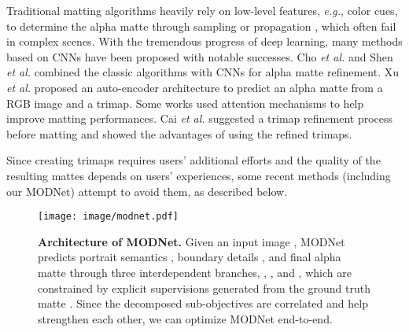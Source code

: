 \documentclass[letterpaper]{article} \usepackage{aaai22}  \usepackage{times}  \usepackage{helvet}  \usepackage{courier}  \usepackage[hyphens]{url}  \usepackage{graphicx} \urlstyle{rm} \def\UrlFont{\rm}  \usepackage{natbib}  \usepackage{caption} \usepackage{booktabs}
\begin{document}
Traditional matting algorithms heavily rely on low-level features, {\it e.g.}, color cues, to determine the alpha matte through sampling \cite{sampling_chuang, sampling_feng, sampling_gastal, sampling_he, sampling_johnson, sampling_karacan, sampling_ruzon,yang2018active} or propagation \cite{prop_aksoy2, prop_aksoy, prop_bai, prop_chen, prop_grady, prop_levin, prop_levin2, prop_sun}, which often fail in complex scenes. With the tremendous progress of deep learning, many methods based on CNNs have been proposed with notable successes. Cho {\it et al.} \cite{NIMUDCNN} and Shen {\it et al.} \cite{DAPM} combined the classic algorithms with CNNs for alpha matte refinement. Xu {\it et al.} \cite{DIM} proposed an auto-encoder architecture to predict an alpha matte from a RGB image and a trimap. Some works \cite{GCA, IndexMatter} used attention mechanisms to help improve matting performances. 
Cai {\it et al.} \cite{AdaMatting} suggested a trimap refinement process before matting and showed the advantages of using the refined trimaps. 

Since creating trimaps requires users' additional efforts and the quality of the resulting mattes depends on users' experiences, some recent methods (including our MODNet) attempt to avoid them, as described below.




\begin{figure*}[t]
\begin{center}
   \texttt{[image: image/modnet.pdf]}
\end{center}
   \caption{\textbf{Architecture of MODNet.}  
    Given an input image , MODNet predicts portrait semantics , boundary details , and final alpha matte  through three interdependent branches, , , and , which are constrained by explicit supervisions generated from the ground truth matte . 
    Since the decomposed sub-objectives are correlated and help strengthen each other, we can optimize MODNet end-to-end.
   }
\label{fig:modnet}
\end{figure*}
\end{document}
